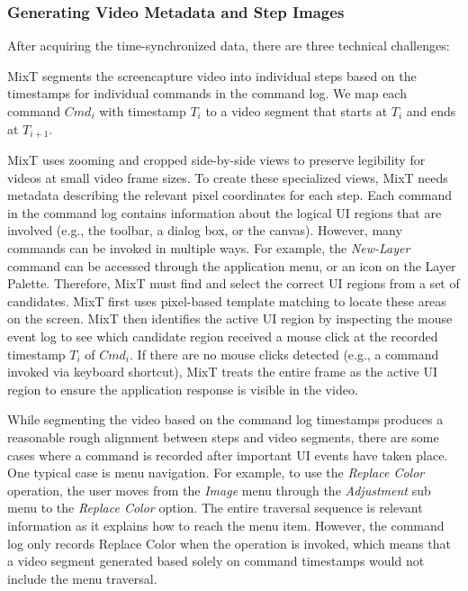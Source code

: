 \subsubsection{Generating Video Metadata and Step Images}
After acquiring the time-synchronized data, there are three technical challenges:

MixT segments the screencapture video into individual steps based on the timestamps for individual commands in the command log. We map each command $Cmd_i$ with timestamp $T_i$ to a video segment that starts at $T_i$ and ends at $T_{i+1}$.

MixT uses zooming and cropped side-by-side views to preserve legibility for videos at small video frame sizes. To create these specialized views, MixT needs metadata describing the relevant pixel coordinates for each step. Each command in the command log contains information about the logical UI regions that are involved (e.g., the toolbar, a dialog box, or the canvas). However, many commands can be invoked in multiple ways. For example, the \emph{New-Layer} command can be accessed through the application menu, or an icon on the Layer Palette. Therefore, MixT must find and select the correct UI regions from a set of candidates. MixT first uses pixel-based template matching \cite{Pongnumkul:2011ju} to locate these areas on the screen. MixT then identifies the active UI region by inspecting the mouse event log to see which candidate region received a mouse click at the recorded timestamp $T_i$ of $Cmd_i$. If there are no mouse clicks detected (e.g., a command invoked via keyboard shortcut), MixT treats the entire frame as the active UI region to ensure the application response is visible in the video.

While segmenting the video based on the command log timestamps produces a reasonable rough alignment between steps and video segments, there are some cases where a command is recorded after important UI events have taken place. One typical case is menu navigation. For example, to use the \emph{Replace Color} operation, the user moves from the \emph{Image} menu through the \emph{Adjustment} sub menu to the \emph{Replace Color} option. The entire traversal sequence is relevant information as it explains how to reach the menu item. However, the command log only records Replace Color when the operation is invoked, which means that a video segment generated based solely on command timestamps would not include the menu traversal.

